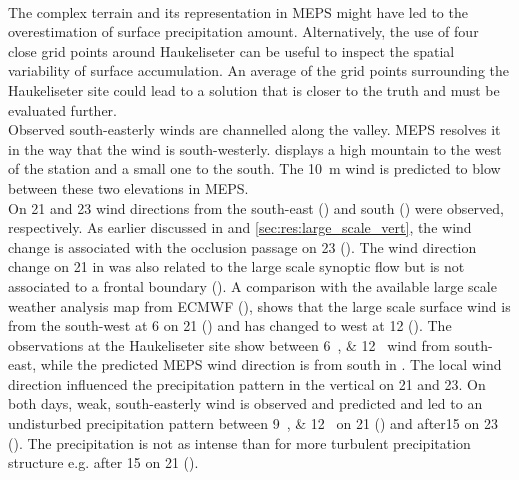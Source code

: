\\
The complex terrain and its representation in MEPS might have led to the overestimation of surface precipitation amount.  Alternatively, the use of four close grid points around Haukeliseter can be useful to inspect the spatial variability of surface accumulation. 
An average of the grid points surrounding the Haukeliseter site could lead to a solution that is closer to the truth and must be evaluated further.
\\
Observed south-easterly winds are channelled along the valley. %
MEPS resolves it in the way that the wind is south-westerly.  displays a high mountain to the west of the station and a small one to the south. The \SI{10}{\metre} wind %
is predicted to blow between these two elevations in MEPS.
\\
On \num{21} and \SI{23}{\dec} wind directions from the south-east () and south () were observed, respectively. As earlier discussed in  and \ref{sec:res:large_scale_vert}, the wind change is associated with the occlusion passage on \SI{23}{\dec} (). 
The wind direction change on \SI{21}{\dec} in  was also related to the large scale synoptic flow but is not associated to a frontal boundary (). A comparison with the available large scale weather analysis map from ECMWF (), shows that the large scale surface wind is from the south-west at \SI{6}{\UTC} on \SI{21}{\dec} () and has changed to west at \SI{12}{\UTC} (). The observations at the Haukeliseter site show between \SIlist{6;12}{\UTC} wind from south-east, while the predicted MEPS wind direction is from south in . The local wind direction influenced the precipitation pattern in the vertical on \num{21} and \SI{23}{\dec}. On both days, weak, south-easterly wind is observed and predicted and led to an undisturbed precipitation pattern between \SIlist{9;12}{\UTC} on \num{21} () and after\SI{15}{\UTC} on \SI{23}{\dec} (). The precipitation is not as intense than for more turbulent precipitation structure e.g. after \SI{15}{\UTC} on \SI{21}{\dec} ().
